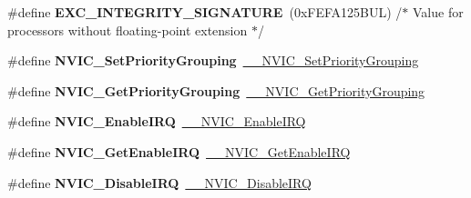 \begin{DoxyCompactItemize}
\mbox{\label{group___c_m_s_i_s___core___n_v_i_c_functions_ga7d1b21b2d863ccd9e23a3295b3173155}} 
\#define {\bfseries E\+X\+C\+\_\+\+I\+N\+T\+E\+G\+R\+I\+T\+Y\+\_\+\+S\+I\+G\+N\+A\+T\+U\+RE}~(0x\+F\+E\+F\+A125\+B\+U\+L)     /$\ast$ Value for processors without floating-\/point extension                $\ast$/
\item 
\mbox{\label{group___c_m_s_i_s___core___n_v_i_c_functions_ga0e798d5aec68cdd8263db86a76df788f}} 
\#define {\bfseries N\+V\+I\+C\+\_\+\+Set\+Priority\+Grouping}~\mbox{\hyperlink{group___c_m_s_i_s___core___n_v_i_c_functions_gafc94dcbaee03e4746ade1f5bb9aaa56d}{\+\_\+\+\_\+\+N\+V\+I\+C\+\_\+\+Set\+Priority\+Grouping}}
\item 
\mbox{\label{group___c_m_s_i_s___core___n_v_i_c_functions_ga4eeb9214f2264fc23c34ad5de2d3fa11}} 
\#define {\bfseries N\+V\+I\+C\+\_\+\+Get\+Priority\+Grouping}~\mbox{\hyperlink{group___c_m_s_i_s___core___n_v_i_c_functions_ga9b894af672df4373eb637f8288845c05}{\+\_\+\+\_\+\+N\+V\+I\+C\+\_\+\+Get\+Priority\+Grouping}}
\item 
\mbox{\label{group___c_m_s_i_s___core___n_v_i_c_functions_ga57b3064413dbc7459d9646020fdd8bef}} 
\#define {\bfseries N\+V\+I\+C\+\_\+\+Enable\+I\+RQ}~\mbox{\hyperlink{group___c_m_s_i_s___core___n_v_i_c_functions_ga71227e1376cde11eda03fcb62f1b33ea}{\+\_\+\+\_\+\+N\+V\+I\+C\+\_\+\+Enable\+I\+RQ}}
\item 
\mbox{\label{group___c_m_s_i_s___core___n_v_i_c_functions_ga857de13232ec65dd15087eaa15bc4a69}} 
\#define {\bfseries N\+V\+I\+C\+\_\+\+Get\+Enable\+I\+RQ}~\mbox{\hyperlink{group___c_m_s_i_s___core___n_v_i_c_functions_gaaeb5e7cc0eaad4e2817272e7bf742083}{\+\_\+\+\_\+\+N\+V\+I\+C\+\_\+\+Get\+Enable\+I\+RQ}}
\item 
\mbox{\label{group___c_m_s_i_s___core___n_v_i_c_functions_ga73b4e251f59cab4e9a5e234aac02ae57}} 
\#define {\bfseries N\+V\+I\+C\+\_\+\+Disable\+I\+RQ}~\mbox{\hyperlink{group___c_m_s_i_s___core___n_v_i_c_functions_gae016e4c1986312044ee768806537d52f}{\+\_\+\+\_\+\+N\+V\+I\+C\+\_\+\+Disable\+I\+RQ}}

\end{DoxyCompactItemize}
